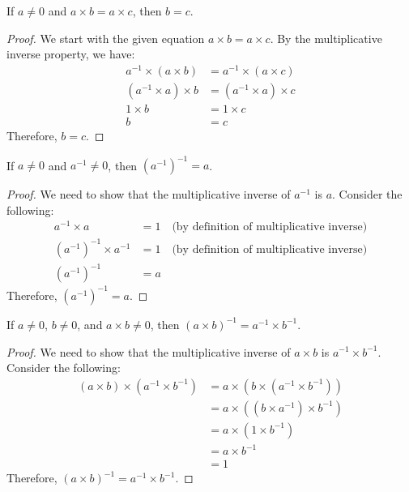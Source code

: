 \documentclass[11pt]{article}
\begin{document}
\begin{proposition}
	If $a \neq 0$ and $a \times b = a \times c$, then $b = c$.
\end{proposition}

\begin{proof}
	We start with the given equation $a \times b = a \times c$. By the multiplicative inverse property, we have:
	\begin{align*}
		a^{-1} \times (a \times b) & = a^{-1} \times (a \times c) \\
		(a^{-1} \times a) \times b & = (a^{-1} \times a) \times c \\
		1 \times b                 & = 1 \times c                 \\
		b                          & = c
	\end{align*}
	Therefore, $b = c$.
\end{proof}

\begin{proposition}
	If $a \neq 0$ and $a^{-1} \neq 0$, then $(a^{-1})^{-1} = a$.
\end{proposition}

\begin{proof}
	We need to show that the multiplicative inverse of $a^{-1}$ is $a$. Consider the following:
	\begin{align*}
		a^{-1} \times a             & = 1 \quad \text{(by definition of multiplicative inverse)} \\
		(a^{-1})^{-1} \times a^{-1} & = 1 \quad \text{(by definition of multiplicative inverse)} \\
		(a^{-1})^{-1}               & = a
	\end{align*}
	Therefore, $(a^{-1})^{-1} = a$.
\end{proof}

\begin{proposition}
	If $a \neq 0$, $b \neq 0$, and $a \times b \neq 0$, then $(a \times b)^{-1} = a^{-1} \times b^{-1}$.
\end{proposition}

\begin{proof}
	We need to show that the multiplicative inverse of $a \times b$ is $a^{-1} \times b^{-1}$. Consider the following:
	\begin{align*}
		(a \times b) \times (a^{-1} \times b^{-1}) & = a \times (b \times (a^{-1} \times b^{-1})) \\
		                                           & = a \times ((b \times a^{-1}) \times b^{-1}) \\
		                                           & = a \times (1 \times b^{-1})                 \\
		                                           & = a \times b^{-1}                            \\
		                                           & = 1
	\end{align*}
	Therefore, $(a \times b)^{-1} = a^{-1} \times b^{-1}$.
\end{proof}
\end{document}
